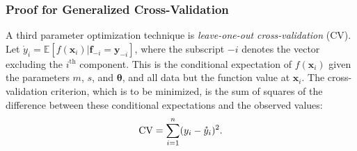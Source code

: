 \documentclass[twocolumn]{svjour3}          %
\newcommand{\bm}[1]{\boldsymbol{#1}}
\newcommand{\Ex}{\mathbb{E}}
\newcommand{\vtheta}{{\bm{\theta}}}
\newcommand{\vf}{\bm{f}}
\newcommand{\vx}{\bm{x}}
\newcommand{\vy}{\bm{y}}
\begin{document}
\subsubsection{Proof for Generalized Cross-Validation} \label{sec:GCV}
A third parameter optimization technique is \emph{leave-one-out cross-validation} (CV).  Let $\mathring{y}_i = \Ex[f(\vx_i ) | \vf_{-i} = \vy_{-i}]$, where the subscript $-i$ denotes the vector excluding the $i^{\text{th}}$ component.  This is the conditional expectation of $f(\vx_i )$ given the parameters $m$, $s$, and $\vtheta$, and all data but the function value at $\vx_i$.  The cross-validation criterion, which is to be minimized, is the sum of squares of the difference between these conditional expectations and the observed values:
\begin{align} \label{FJH:eq:CVA}
\textup{CV} = \sum_{i=1}^n (y_i - \mathring{y}_i)^2.
\end{align}
\end{document}
